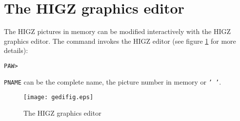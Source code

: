 \clearpage
\section{The HIGZ graphics editor}

The HIGZ pictures in memory can be modified interactively with the HIGZ
graphics editor. 
The command  invokes the HIGZ editor
(see figure \ref{fig:GEDIFIG} for more details):
\begin{alltt}
PAW > 
\end{alltt}
\texttt{PNAME} can be the complete name, the picture number in memory
or \texttt{' '}.

\begin{figure}
\texttt{[image: gedifig.eps]}
\caption{The HIGZ graphics editor}
\label{fig:GEDIFIG}
\end{figure}

\endinput